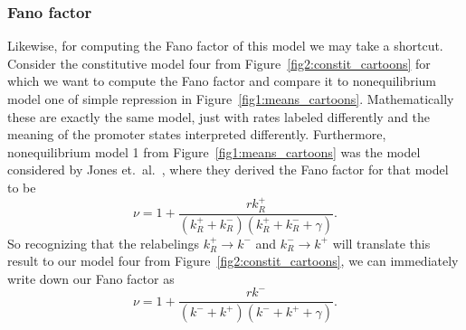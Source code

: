 \subsubsection{Fano factor}
Likewise, for computing the Fano factor of this model we may take a shortcut.
Consider the constitutive model four from Figure~\ref{fig2:constit_cartoons} for
which we want to compute the Fano factor and compare it to nonequilibrium model
one of simple repression in Figure~\ref{fig1:means_cartoons}. Mathematically
these are exactly the same model, just with rates labeled differently and the
meaning of the promoter states interpreted differently. Furthermore,
nonequilibrium model 1 from Figure~\ref{fig1:means_cartoons} was the model
considered by Jones et.\ al.~\cite{Jones2014}, where they derived the Fano
factor for that model to be
\begin{equation}
\nu = 1 + \frac{r k_R^+}{(k_R^+ + k_R^-)(k_R^+ + k_R^- + \gamma)}.
\end{equation}
So recognizing that the relabelings $k_R^+ \rightarrow k^-$ and
$k_R^- \rightarrow k^+$ will translate this result to our model four from
Figure~\ref{fig2:constit_cartoons}, we can immediately write down our Fano
factor as
\begin{equation}
\nu = 1 + \frac{r k^-}{(k^- + k^+)(k^- + k^+ + \gamma)}.
\end{equation}